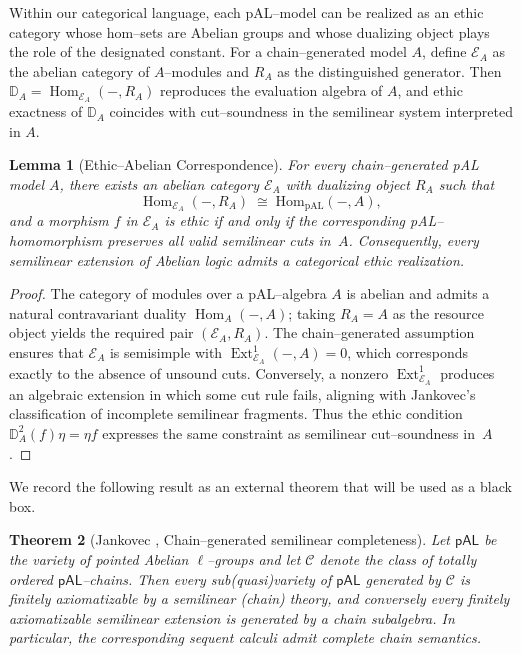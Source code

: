 \documentclass[12pt]{article}
\newcommand{\E}{\mathcal{E}}
\newcommand{\Hom}{\operatorname{Hom}}
\newcommand{\Ext}{\operatorname{Ext}}
\theoremstyle{plain}
\newtheorem{theorem}{Theorem}[section]
\newtheorem{lemma}[theorem]{Lemma}
\theoremstyle{definition}
\theoremstyle{remark}
\numberwithin{equation}{section}
\begin{document}
Within our categorical language, each pAL--model can be realized as an ethic category whose hom--sets are Abelian groups and whose dualizing object plays the role of the designated constant.  For a chain--generated model $A$, define $\E_A$ as the abelian category of $A$--modules and $R_A$ as the distinguished generator.  Then $\mathbb D_A=\Hom_{\E_A}(-,R_A)$ reproduces the evaluation algebra of $A$, and ethic exactness of $\mathbb D_A$ coincides with cut--soundness in the semilinear system interpreted in $A$.

\begin{lemma}[Ethic--Abelian Correspondence]
For every chain--generated pAL model $A$, there exists an abelian category $\E_A$ with dualizing object $R_A$ such that
\[
\Hom_{\E_A}(-,R_A)\;\cong\;\mathrm{Hom}_{\mathrm{pAL}}(-,A),
\]
and a morphism $f$ in $\E_A$ is ethic if and only if the corresponding pAL--homomorphism preserves all valid semilinear cuts in~$A$.  
Consequently, every semilinear extension of Abelian logic admits a categorical ethic realization.
\end{lemma}

\begin{proof}
The category of modules over a pAL--algebra $A$ is abelian and admits a natural contravariant duality $\Hom_A(-,A)$; taking $R_A=A$ as the resource object yields the required pair $(\E_A,R_A)$.  
The chain--generated assumption ensures that $\E_A$ is semisimple with $\Ext^1_{\E_A}(-,A)=0$, which corresponds exactly to the absence of unsound cuts.  
Conversely, a nonzero $\Ext^1_{\E_A}$ produces an algebraic extension in which some cut rule fails, aligning with Jankovec's classification of incomplete semilinear fragments.  
Thus the ethic condition $\mathbb D_A^2(f)\eta=\eta f$ expresses the same constraint as semilinear cut--soundness in~$A$.
\end{proof}

We record the following result as an external theorem that will be used as a black box.

\begin{theorem}[Jankovec {\cite{Jankovec2025}}, Chain–generated semilinear completeness]\label{thm:jankovec}
Let $\mathsf{pAL}$ be the variety of pointed Abelian $\ell$–groups and let $\mathcal C$ denote the class of totally ordered $\mathsf{pAL}$–chains. Then every sub(quasi)variety of $\mathsf{pAL}$ generated by $\mathcal C$ is finitely axiomatizable by a semilinear (chain) theory, and conversely every finitely axiomatizable semilinear extension is generated by a chain subalgebra. In particular, the corresponding sequent calculi admit complete chain semantics.
\end{theorem}
\end{document}
